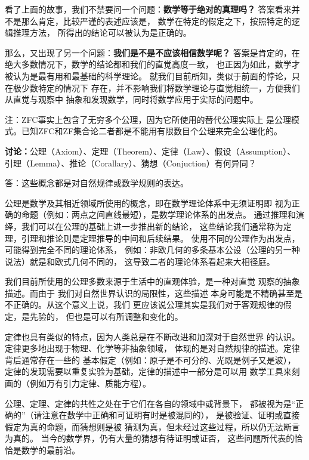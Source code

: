 \begin{shaded}
	看了上面的故事，我们不禁要问一个问题：{\bf 数学等于绝对的真理吗？}
	答案看来并不是那么肯定，比较严谨的表述应该是，{\kaishu 
	数学在特定的假定之下，按照特定的逻辑推理方法，
	所得出的结论可以被认为是正确的}。

	那么，又出现了另一个问题：{\bf 我们是不是不应该相信数学呢？}
	答案是肯定的，在绝大多数情况下，数学的结论都和我们的直觉高度一致，
	也正因为如此，数学才被认为是最有用和最基础的科学理论。
	就我们目前所知，类似于前面的悖论，只在极少数特定的情况下
	存在，并不影响我们将数学理论与直觉相统一，方便我们从直觉与观察中
	抽象和发现数学，同时将数学应用于实际的问题中。
	
	注：ZFC事实上包含了无穷多个公理，因为它所使用的替代公理实际上
	是公理模式。已知ZFC和ZF集合论二者都是不能用有限数目个公理来完全公理化的。
	
	\bs

	{\bf 讨论：}公理（Axiom）、定理（Theorem）、定律（Law）、假设（Assumption）、
	引理（Lemma）、推论（Corallary）、猜想（Conjuction）有何异同？
	
	答：这些概念都是对自然规律或数学规则的表达。
	
	公理是数学及其相近领域所使用的概念，即在数学理论体系中无须证明即
	视为正确的命题（例如：两点之间直线最短），是数学理论体系的出发点。
	通过推理和演绎，我们可以在公理的基础上进一步推出新的结论，
	这些结论我们通常称为定理，引理和推论则是定理推导的中间和后续结果。
	使用不同的公理作为出发点，可能得到完全不同的理论体系，
	例如：非欧几何的多条基本公设（公理的另一种说法）就是和欧式几何不同的，
	这导致二者的理论体系看起来大相径庭。
	
	我们目前所使用的公理多数来源于生活中的直观体验，是一种对直觉
	观察的抽象描述。而由于	我们对自然世界认识的局限性，这些描述
	本身可能是不精确甚至是不正确的。从这个意义上说，我们
	更应该说公理其实是我们对于客观规律的假定，是先验的，
	但也是可以有所调整和变化的。
	
	定律也具有类似的特点，因为人类总是在不断改进和加深对于自然世界
	的认识。定律更多地出现于物理、化学等非抽象领域，
	体现的是对自然规律的描述。定律背后通常存在一些的
	基本假定（例如：原子是不可分的、光既是例子又是波），
	定律的发现需要以重复实验为基础，定律的描述中一部分是可以用
	数学工具来刻画的（例如万有引力定律、质能方程）。
	
	公理、定理、定律的共性之处在于它们在各自的领域中或背景下，
	都被视为是“正确的”（请注意在数学中正确和可证明有时是被混同的），
	是被验证、证明或直接假定为真的命题，而猜想则是被
	猜测为真，但未经过这些过程，所以仍无法断言为真的。
	当今的数学界，仍有大量的猜想有待证明或证否，
	这些问题所代表的恰恰是数学的最前沿。\fin 
\end{shaded}
	
